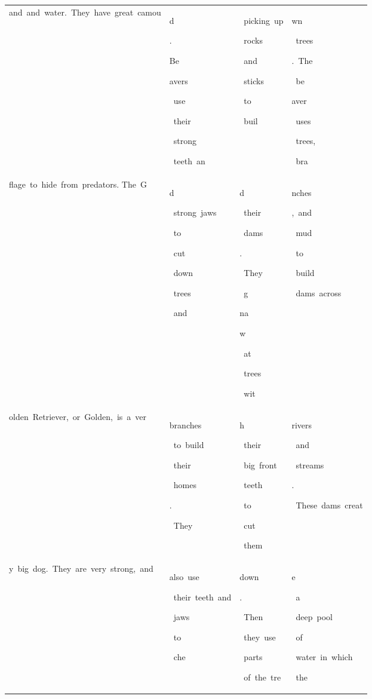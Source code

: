 \begin{table}[h]
\begin{tabular} { l l l l }
 and\ and\ water.\ They\ have\ great\ camou & \colorbox{cm_0!40}{\strut d}\colorbox{cm_12!40}{\strut .}\colorbox{cm_25!40}{\strut Be}\colorbox{cm_38!40}{\strut avers}\colorbox{cm_0!40}{\strut \ use}\colorbox{cm_12!40}{\strut \ their}\colorbox{cm_0!40}{\strut \ strong}\colorbox{cm_12!40}{\strut \ teeth\ an} & \colorbox{cm_0!40}{\strut \ picking\ up}\colorbox{cm_12!40}{\strut \ rocks}\colorbox{cm_25!40}{\strut \ and}\colorbox{cm_0!40}{\strut \ sticks}\colorbox{cm_12!40}{\strut \ to}\colorbox{cm_25!40}{\strut \ buil} & \colorbox{cm_0!40}{\strut wn}\colorbox{cm_12!40}{\strut \ trees}\colorbox{cm_25!40}{\strut .\ The}\colorbox{cm_12!40}{\strut \ be}\colorbox{cm_25!40}{\strut aver}\colorbox{cm_0!40}{\strut \ uses}\colorbox{cm_12!40}{\strut \ trees,}\colorbox{cm_0!40}{\strut \ bra} \\ 
 flage\ to\ hide\ from\ predators.  The\ G & \colorbox{cm_12!40}{\strut d}\colorbox{cm_0!40}{\strut \ strong\ jaws}\colorbox{cm_12!40}{\strut \ to}\colorbox{cm_0!40}{\strut \ cut}\colorbox{cm_12!40}{\strut \ down}\colorbox{cm_25!40}{\strut \ trees}\colorbox{cm_12!40}{\strut \ and}\colorbox{cm_0!40}{\strut \ } & \colorbox{cm_25!40}{\strut d}\colorbox{cm_12!40}{\strut \ their}\colorbox{cm_0!40}{\strut \ dams}\colorbox{cm_12!40}{\strut .}\colorbox{cm_25!40}{\strut \ They}\colorbox{cm_12!40}{\strut \ g}\colorbox{cm_25!40}{\strut na}\colorbox{cm_38!40}{\strut w}\colorbox{cm_51!40}{\strut \ at}\colorbox{cm_12!40}{\strut \ trees}\colorbox{cm_0!40}{\strut \ wit} & \colorbox{cm_0!40}{\strut nches}\colorbox{cm_12!40}{\strut ,\ and}\colorbox{cm_0!40}{\strut \ mud}\colorbox{cm_12!40}{\strut \ to}\colorbox{cm_25!40}{\strut \ build}\colorbox{cm_0!40}{\strut \ dams\ across\ } \\ 
 olden\ Retriever,\ or\ Golden,\ is\ a\ ver & \colorbox{cm_0!40}{\strut branches}\colorbox{cm_12!40}{\strut \ to\ build}\colorbox{cm_25!40}{\strut \ their}\colorbox{cm_38!40}{\strut \ homes}\colorbox{cm_12!40}{\strut .}\colorbox{cm_25!40}{\strut \ They}\colorbox{cm_0!40}{\strut \ } & \colorbox{cm_0!40}{\strut h}\colorbox{cm_12!40}{\strut \ their}\colorbox{cm_0!40}{\strut \ big\ front}\colorbox{cm_12!40}{\strut \ teeth}\colorbox{cm_25!40}{\strut \ to}\colorbox{cm_12!40}{\strut \ cut}\colorbox{cm_0!40}{\strut \ them\ } & \colorbox{cm_0!40}{\strut rivers}\colorbox{cm_12!40}{\strut \ and}\colorbox{cm_0!40}{\strut \ streams}\colorbox{cm_12!40}{\strut .}\colorbox{cm_0!40}{\strut \ These\ dams\ creat} \\ 
 y\ big\ dog.\ They\ are\ very\ strong,\ and & \colorbox{cm_0!40}{\strut also\ use}\colorbox{cm_12!40}{\strut \ their\ teeth\ and}\colorbox{cm_0!40}{\strut \ jaws}\colorbox{cm_12!40}{\strut \ to}\colorbox{cm_0!40}{\strut \ che} & \colorbox{cm_0!40}{\strut down}\colorbox{cm_12!40}{\strut .}\colorbox{cm_0!40}{\strut \ Then}\colorbox{cm_12!40}{\strut \ they\ use}\colorbox{cm_0!40}{\strut \ parts}\colorbox{cm_12!40}{\strut \ of\ the\ tre} & \colorbox{cm_0!40}{\strut e}\colorbox{cm_12!40}{\strut \ a}\colorbox{cm_0!40}{\strut \ deep\ pool}\colorbox{cm_12!40}{\strut \ of}\colorbox{cm_0!40}{\strut \ water\ in\ which}\colorbox{cm_12!40}{\strut \ the\ } \\ 

\end{tabular}
\end{table}
